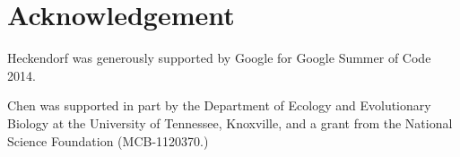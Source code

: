 \section*{Acknowledgement}

Heckendorf was generously supported by Google for Google Summer of Code 2014.

Chen was supported in part by
the Department of Ecology and Evolutionary Biology at the
University of Tennessee, Knoxville, and a grant from
the National Science Foundation (MCB-1120370.)
